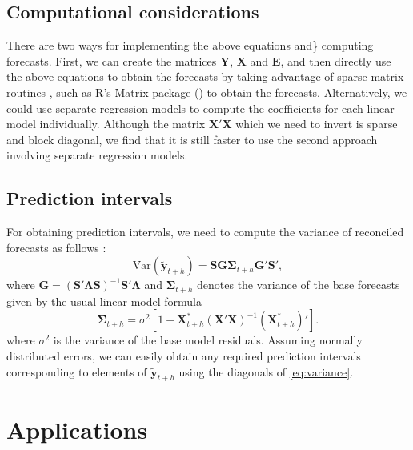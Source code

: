 \documentclass[11pt,a4paper,]{article}
\begin{document}
\hypertarget{computational-considerations}{%
\subsection{\texorpdfstring{Computational considerations \label{sec:computationalconsiderations}}{Computational considerations }}\label{computational-considerations}}

There are two ways for implementing the above equations and\} computing forecasts. First, we can create the matrices \(\bm{Y}\), \(\bm{X}\) and \(\bm{E}\), and then directly use the above equations to obtain the forecasts by taking advantage of sparse matrix routines \autocite{bunch2014sparse}, such as R's Matrix package (\textcite{maechler20062nd}) to obtain the forecasts. Alternatively, we could use separate regression models to compute the coefficients for each linear model individually. Although the matrix \(\bm{X}'\bm{X}\) which we need to invert is sparse and block diagonal, we find that it is still faster to use the second approach involving separate regression models.

\hypertarget{prediction-intervals}{%
\subsection{Prediction intervals}\label{prediction-intervals}}

For obtaining prediction intervals, we need to compute the variance of reconciled forecasts as follows \autocite{mint2018}:
\begin{equation}\label{eq:variance}
    \text{Var}(\tilde{\bm{y}}_{t+h})
        = \bm{S}\bm{G}{\bm{\Sigma}_{t+h}} \bm{G}'\bm{S}',
\end{equation}
where \(\bm{G} = (\bm{S}'\bm{\Lambda}\bm{S})^{-1}\bm{S}'\bm{\Lambda}\) and \({\bm{\Sigma}_{t+h}}\) denotes the variance of the base forecasts given by the usual linear model formula \autocite{fpp2}
\begin{equation}\label{eq:recvariance}
  \bm{\Sigma}_{t+h} = \sigma^2\left[1 + \bm{X}_{t+h}^*(\bm{X}'\bm{X})^{-1}(\bm{X}_{t+h}^*)'\right].
\end{equation}
where \(\sigma^2\) is the variance of the base model residuals. Assuming normally distributed errors, we can easily obtain any required prediction intervals corresponding to elements of \(\tilde{\bm{y}}_{t+h}\) using the diagonals of \eqref{eq:variance}.

\hypertarget{applications}{%
\section{Applications}\label{applications}}
\end{document}
